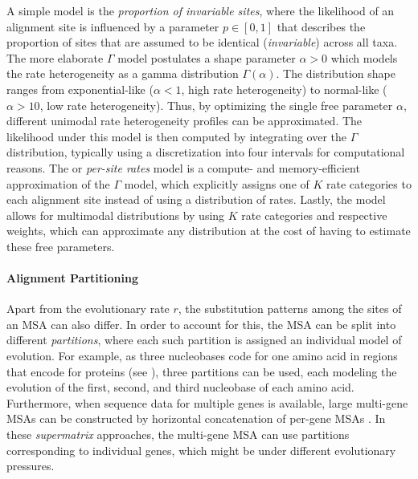 A simple model is the \emph{proportion of invariable sites},
where the likelihood of an alignment site is influenced by a parameter $p \in [0,1]$
that describes the proportion of sites that are assumed to be identical (\emph{invariable}) across all taxa.
The more elaborate $\Gamma$ model \cite{Yang1994a} postulates a shape parameter $\alpha > 0$
which models the rate heterogeneity as a gamma distribution $\Gamma(\alpha)$.
The distribution shape ranges from exponential-like ($\alpha < 1$, high rate heterogeneity)
to normal-like ($\alpha > 10$, low rate heterogeneity).
Thus, by optimizing the single free parameter $\alpha$,
different unimodal rate heterogeneity profiles can be approximated.
The likelihood under this model is then computed by integrating over the $\Gamma$ distribution,
typically using a discretization into four intervals for computational reasons.
The  or \emph{per-site rates} model \cite{Stamatakis2006a}
is a compute- and memory-efficient approximation of the $\Gamma$ model,
which explicitly assigns one of $K$ rate categories to each alignment site instead of using a distribution of rates.
Lastly, the  model \cite{Yang1995} allows for multimodal distributions
by using $K$ rate categories and respective weights,
which can approximate any distribution at the cost of having to estimate these free parameters.

\paragraph{Alignment Partitioning}
\label{ch:Foundations:sec:MLTreeInference:sub:FurtherAspects:par:AlignmentPartitioning}

Apart from the evolutionary rate $r$, the substitution patterns among the sites of an MSA can also differ.
In order to account for this, the MSA can be split into different \emph{partitions},
where each such partition is assigned an individual model of evolution.
For example, as three nucleobases code for one amino acid in regions that encode for proteins
(see ),
three partitions can be used, each modeling the evolution of the first, second, and third nucleobase of each amino acid.
Furthermore, when sequence data for multiple genes is available,
large multi-gene MSAs can be constructed by horizontal concatenation of per-gene MSAs \cite{Tonini2015a}.
In these \emph{supermatrix} approaches, the multi-gene MSA can use partitions corresponding to individual genes,
which might be under different evolutionary pressures.

